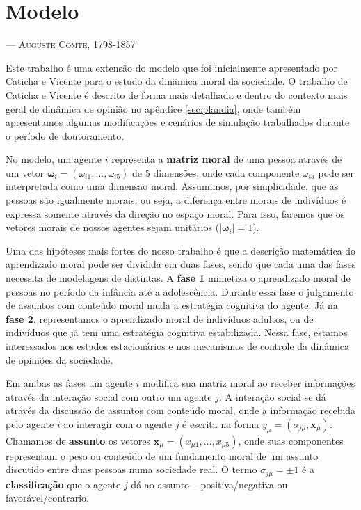 \chapter{Modelo} %
\begin{epigraphs}
{\---- \textsc{Auguste Comte, 1798-1857}}
\end{epigraphs}

Este trabalho é uma extensão do modelo que foi inicialmente apresentado
por  Caticha e Vicente \cite{Caticha2011a} para o estudo da dinâmica
moral da sociedade. O trabalho de Caticha e Vicente é descrito de forma
mais detalhada e dentro do contexto mais geral de dinâmica de opinião no
apêndice \ref{sec:plandia}, onde também apresentamos algumas modificações
e cenários de simulação trabalhados durante o período de doutoramento.

No modelo, um  agente $i$ representa a \textbf{matriz moral} de uma pessoa 
através de um vetor $\bm \omega_i = (\omega_{i 1},\ldots,\omega_{i 5})$
de 5 dimensões, onde cada componente $\omega_{i a}$ pode ser interpretada
como uma dimensão moral.  Assumimos, por simplicidade, que as pessoas
são igualmente morais, ou seja, a diferença entre morais de indivíduos é
expressa somente através da direção no espaço moral. Para isso, faremos que
os vetores morais de nossos agentes sejam unitários ($|\bm \omega_i| = 1$).

Uma das hipóteses mais fortes do nosso trabalho é que a descrição
matemática do aprendizado moral pode ser dividida em duas fases, sendo que
cada uma das fases necessita de modelagens de distintas. A \textbf{fase 1}
mimetiza o aprendizado moral de pessoas no período da infância até a
adolescência. Durante essa fase o julgamento de assuntos com conteúdo moral
muda a estratégia cognitiva do agente. Já na \textbf{fase 2}, representamos
o aprendizado moral de indivíduos adultos, ou de indivíduos que já tem
uma estratégia cognitiva estabilizada. Nessa fase, estamos interessados
nos estados estacionários e nos mecanismos de controle da dinâmica de
opiniões da sociedade.

Em ambas as fases um agente $i$ modifica sua matriz moral ao receber
informações através da interação social com outro um agente $j$.
A interação social se dá através da discussão de assuntos com conteúdo
moral, onde a informação recebida pelo agente $i$ ao interagir com o
agente $j$  é escrita na forma $y_\mu=(\sigma_{j\mu},\bm x_\mu)$. Chamamos
de \textbf{assunto} os vetores $\bm x_\mu = (x_{\mu 1},\ldots,x_{\mu 5})$,
onde suas componentes representam o peso ou conteúdo de um fundamento moral
de um assunto discutido entre duas pessoas numa sociedade real.  O termo
$\sigma_{j\mu} = \pm 1$  é a \textbf{classificação}  que o agente $j$
dá ao assunto -- positiva/negativa ou favorável/contrario.

